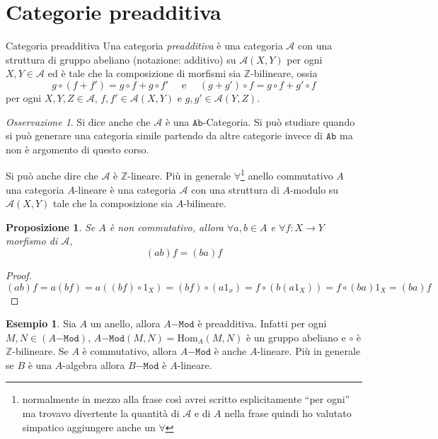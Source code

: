 \documentclass[notitlepage]{report}
\newcounter{theo}[section]\setcounter{theo}{0}
\newcounter{excounter}[section]\setcounter{excounter}{0}
\numberwithin{equation}{section}
\theoremstyle{plain}
\newtheorem{proposition}[theo]{Proposizione}
\theoremstyle{definition}
\newtheorem{example}[excounter]{Esempio}
\theoremstyle{remark}
\newtheorem*{remark}{Osservazione}
\begin{document}
\section{Categorie preadditiva}
\begin{definition}{Categoria preadditiva}
    Una categoria \emph{preadditiva} è una categoria \(\mathcal{A}\) con una
    struttura di gruppo abeliano (notazione: additivo) su \(\mathcal{A}{(X, Y)}\) per ogni \(X, Y \in \mathcal{A}\) ed è tale che la composizione di morfismi sia \(\mathbb{Z}\)-bilineare, ossia
    \[
      g \circ {(f + f')} = g \circ f + g \circ f' \quad \text{ e } \quad {(g +
      g')} \circ f = g \circ f + g' \circ f 
    \]
    per ogni \(
    X, Y, Z \in \mathcal{A}\), \(f, f' \in \mathcal{A}{(X, Y)}\) e \(g, g' \in \mathcal{A}{(Y, Z)}\).
\end{definition}
\begin{remark}{}
    Si dice anche che \(\mathcal{A}\) è una \(\mathtt{Ab}\)-Categoria. Si può
    studiare quando si può generare una categoria simile partendo da altre
    categorie invece di \(\mathtt{Ab}\) ma non è argomento di questo corso.

    Si può anche dire che \(\mathcal{A}\) è \(\mathbb{Z}\)-lineare. Più in
    generale \(\forall\)\footnote{normalmente in mezzo alla frase così avrei scritto esplicitamente ``per ogni'' ma trovavo divertente la quantità di \(\mathcal{A}\) e di \(A\) nella frase quindi ho valutato simpatico aggiungere anche un \(\forall\)} anello commutativo \(A\) una categoria \(A\)-lineare è
    una categoria \(\mathcal{A}\) con una struttura di \(A\)-modulo su \(\mathcal{A}{(X,Y)}\) tale che la composizione sia \(A\)-bilineare.
\end{remark}
\begin{proposition}{}
    Se \(A\) è non commutativo, allora \(\forall a, b \in A\) e \(\forall f :
    X\to Y\) morfismo di \(\mathcal{A}\),
    \[
      {(ab)}f = {(ba)}f
    \]
\end{proposition}
\begin{proof}{}
    \[
      {(ab)}f = a{(bf)} = a{({(bf)}\circ 1_X)} = {(bf)} \circ {(a1_x)} = f \circ
      {(b{(a 1_X)})} = f \circ {(ba)}1_X = {(ba)}f
    \]
\end{proof}

\begin{example}{}
    Sia \(A\) un anello, allora \(A\mathtt{-Mod}\) è preadditiva. Infatti per
    ogni \(M, N \in {(A\mathtt{-Mod})}\), \(A\mathtt{-Mod}{(M, N)} = \mathrm{Hom}_A{(M, N)}\) è un gruppo abeliano e \(\circ\) è \(\mathbb{Z}\)-bilineare. Se \(A\) è commutativo, allora \(A\mathtt{-Mod}\) è anche \(A\)-lineare.
    Più in generale se \(B\) è una \(A\)-algebra allora \(B\mathtt{-Mod}\) è \(A\)-lineare.
\end{example}
\end{document}
